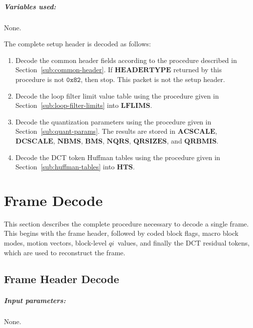 \documentclass[11pt,letterpaper]{book}
\newcommand{\idx}[1]{{\ensuremath{\mathit{#1}}}}
\newcommand{\qi}{\idx{qi}}
\newcommand{\bitvar}[1]{\ensuremath{\mathbf{\bm #1}}}
\newcommand{\hex}[1]{\ensuremath{\mathtt{0x#1}}}
\numberwithin{equation}{chapter}
\numberwithin{figure}{chapter}
\numberwithin{table}{chapter}
\begin{document}
\paragraph{Variables used:} None.
\medskip

The complete setup header is decoded as follows:

\begin{enumerate}
\item
Decode the common header fields according to the procedure described in
 Section~\ref{sub:common-header}.
If \bitvar{HEADERTYPE} returned by this procedure is not \hex{82}, then stop.
This packet is not the setup header.
\item
Decode the loop filter limit value table using the procedure given in
 Section~\ref{sub:loop-filter-limits} into \bitvar{LFLIMS}.
\item
Decode the quantization parameters using the procedure given in
 Section~\ref{sub:quant-params}.
The results are stored in \bitvar{ACSCALE}, \bitvar{DCSCALE}, \bitvar{NBMS},
 \bitvar{BMS}, \bitvar{NQRS}, \bitvar{QRSIZES}, and \bitvar{QRBMIS}.
\item
Decode the DCT token Huffman tables using the procedure given in
 Section~\ref{sub:huffman-tables} into \bitvar{HTS}.
\end{enumerate}

\chapter{Frame Decode}

This section describes the complete procedure necessary to decode a single
 frame.
This begins with the frame header, followed by coded block flags, macro block
 modes, motion vectors, block-level \qi\ values, and finally the DCT residual
 tokens, which are used to reconstruct the frame.

\section{Frame Header Decode}
\label{sub:frame-header}

\paragraph{Input parameters:} None.
\end{document}

